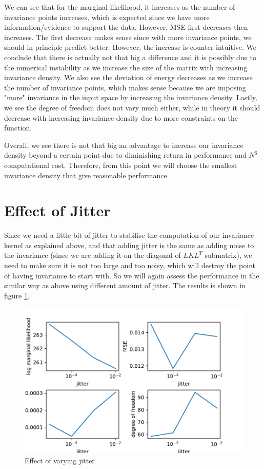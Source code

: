 \documentclass{statsmsc}
\begin{document}
We can see that for the marginal likelihood, it increases as the number of invariance points increases, which is expected since we have more information/evidence to support the data.
However, MSE first decreases then increases.
The first decrease makes sense since with more invariance points, we should in principle predict better.
However, the increase is counter-intuitive.
We conclude that there is actually not that big a difference and it is possibly due to the numerical instability as we increase the size of the matrix with increasing invariance density.  
We also see the deviation of energy decreases as we increase the number of invariance points, which makes sense because we are imposing "more" invariance in the input space by increasing the invariance density.
Lastly, we see the degree of freedom does not vary much either, while in theory it should decrease with increasing invariance density due to more constraints on the function.

Overall, we see there is not that big an advantage to increase our invariance density beyond a certain point due to diminishing return in performance and $N^6$ computational cost.
Therefore, from this point we will choose the smallest invariance density that give reasonable performance.  

\section{Effect of Jitter}
Since we need a little bit of jitter to stabilise the computation of our invariance kernel as explained above, and that adding jitter is the same as adding noise to the invariance (since we are adding it on the diagonal of $LKL^T$ submatrix), we need to make sure it is not too large and too noisy, which will destroy the point of having invariance to start with. 
So we will again assess the performance in the similar way as above using different amount of jitter.
The results is shown in figure \ref{fig:vary_jitter}.

\begin{figure}[H] 
  \includegraphics[width=0.8\linewidth]{../codes/figures/vary_jitter.pdf}
  \centering
  \caption{Effect of varying jitter}
  \label{fig:vary_jitter}
\end{figure}
\end{document}
